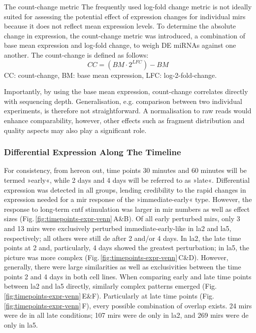 \begin{mybox}{The count-change metric}\label{box:count-change}
The frequently used log-fold change metric is not ideally suited for assessing the potential effect of expression changes for individual \acp{mir} because it does not reflect mean expression levels. To determine the absolute change in expression, the count-change metric was introduced, a combination of base mean expression and log-fold change, to weigh DE miRNAs against one another. The count-change is defined as follows: $$CC = (BM \cdot 2^{LFC}) - BM$$
CC: count-change, BM: base mean expression, LFC: log-2-fold-change.

Importantly, by using the base mean expression, count-change correlates directly with sequencing depth. Generalisation, e.g. comparison between two individual experiments, is therefore not straightforward. A normalisation to raw reads would enhance comparability, however, other effects such as fragment distribution and quality aspects may also play a significant role.
\end{mybox}

\subsubsection{Differential Expression Along The Timeline} \label{sec:cellculture:along}
For consistency, from hereon out, time points 30 minutes and 60 minutes will be termed »early«, while 2 days and 4 days will be referred to as »late«. Differential expression was detected in all groups, lending credibility to the rapid changes in expression needed for a \ac{mir} response of the »immediate-early« type. However, the response to long-term \ac{cntf} stimulation was larger in \ac{mir} numbers as well as effect sizes (Fig.\,\ref{fig:timepoints-expr-venn}\,A\&B). Of all early perturbed \acp{mir}, only 3 and 13 \acp{mir} were exclusively perturbed immediate-early-like in \ac{la2} and \ac{la5}, respectively; all others were still \ac{de} after 2 and/or 4 days. In \ac{la2}, the late time points at 2 and, particularly, 4 days showed the greatest perturbation; in \ac{la5}, the picture was more complex (Fig.\,\ref{fig:timepoints-expr-venn}\,C\&D). However, generally, there were large similarities as well as exclusivities between the time points 2 and 4 days in both cell lines. When comparing early and late time points between \ac{la2} and \ac{la5} directly, similarly complex patterns emerged (Fig.\,\ref{fig:timepoints-expr-venn}\,E\&F). Particularly at late time points (Fig.\,\ref{fig:timepoints-expr-venn}\,F), every possible combination of overlap exists. 24 \acp{mir} were \ac{de} in all late conditions; 107 \acp{mir} were \ac{de} only in \ac{la2}, and 269 \acp{mir} were \ac{de} only in \ac{la5}.


